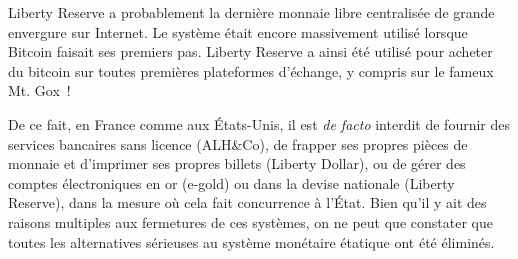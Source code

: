 Liberty Reserve a probablement la dernière monnaie libre centralisée de grande envergure sur Internet. Le système était encore massivement utilisé lorsque Bitcoin faisait ses premiers pas. Liberty Reserve a ainsi été utilisé pour acheter du bitcoin sur toutes premières plateformes d'échange, y compris sur le fameux Mt. Gox~!


De ce fait, en France comme aux États-Unis, il est \emph{de facto} interdit de fournir des services bancaires sans licence (ALH\&Co), de frapper ses propres pièces de monnaie et d'imprimer ses propres billets (Liberty Dollar), ou de gérer des comptes électroniques en or (e-gold) ou dans la devise nationale (Liberty Reserve), dans la mesure où cela fait concurrence à l'État. Bien qu'il y ait des raisons multiples aux fermetures de ces systèmes, on ne peut que constater que toutes les alternatives sérieuses au système monétaire étatique ont été éliminés.

